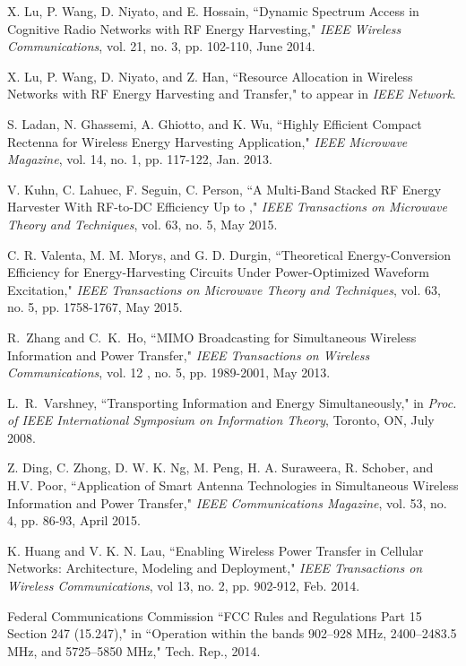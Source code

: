 \documentclass[twocolumn,10pt]{IEEEtran}
\begin{document}
\begin{thebibliography}{99}
X. Lu, P. Wang, D. Niyato, and E. Hossain, ``Dynamic Spectrum Access in Cognitive Radio Networks with RF Energy Harvesting," \emph{IEEE Wireless Communications}, vol. 21, no. 3, pp. 102-110, June 2014. 

X. Lu, P. Wang, D. Niyato, and Z. Han, ``Resource Allocation in Wireless Networks with RF Energy Harvesting and Transfer," to appear in \emph{IEEE Network}.




S. Ladan, N. Ghassemi, A. Ghiotto, and K. Wu, ``Highly Efficient Compact Rectenna for Wireless Energy Harvesting Application," \emph{IEEE Microwave Magazine},  vol. 14, no. 1,	pp. 117-122, Jan. 2013.

V. Kuhn, C. Lahuec, F. Seguin, C. Person, 
``A Multi-Band Stacked RF Energy Harvester With RF-to-DC Efficiency Up to ," \emph{IEEE Transactions on Microwave Theory and Techniques}, vol. 63, no. 5, May 2015. 

C. R. Valenta,  M. M. Morys, and G. D. Durgin, 
``Theoretical Energy-Conversion Efficiency for Energy-Harvesting Circuits Under Power-Optimized Waveform Excitation," 
\emph{IEEE Transactions on Microwave Theory and Techniques}, vol. 63, no. 5, pp. 1758-1767, May 2015.


R.~Zhang and C.~K.~Ho, ``MIMO Broadcasting for Simultaneous Wireless Information and Power Transfer," \emph{IEEE Transactions on Wireless Communications}, vol. 12 , no. 5, pp. 1989-2001, May 2013.

L.~R.~Varshney, ``Transporting Information and Energy Simultaneously," in {\em Proc. of IEEE International Symposium on Information Theory}, Toronto, ON, July 2008.

Z. Ding, C. Zhong, D. W. K. Ng, M. Peng,  H. A. Suraweera,  R. Schober, and H.V. Poor,   
``Application of Smart Antenna Technologies in Simultaneous Wireless Information and Power Transfer," \emph{IEEE Communications Magazine},  
vol. 53, no. 4, pp. 86-93, April  2015. 

K. Huang and V. K. N. Lau, ``Enabling Wireless Power Transfer in Cellular Networks: Architecture, Modeling and Deployment," \emph{IEEE Transactions on Wireless Communications}, vol 13, no. 2, pp. 902-912, Feb. 2014.


Federal Communications Commission ``FCC Rules and Regulations
Part 15 Section 247 (15.247)," in ``Operation within the bands 902–928
MHz, 2400–2483.5 MHz, and 5725–5850 MHz," Tech. Rep., 2014.


\end{thebibliography}
\end{document}

